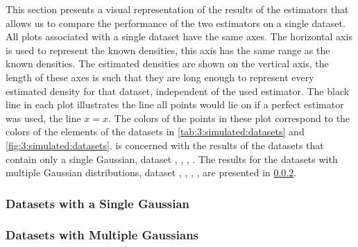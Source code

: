 This section presents a visual representation of the results of the estimators that allows us to compare the performance of the two estimators on a single dataset. All plots associated with a single dataset have the same axes. The horizontal axis is used to represent the known densities, this axis has the same range as the known densities. The estimated densities are shown on the vertical axis, the length of these axes is such that they are long enough to represent every estimated density for that dataset, independent of the used estimator. The black line in each plot illustrates the line all points would lie on if a perfect estimator was used, \ie the line $x = x$. The colors of the points in these plot correspond to the colors of the elements of the datasets in \cref{tab:3:simulated:datasets} and \cref{fig:3:simulated:datasets}.  is concerned with the results of the datasets that contain only a single Gaussian, \ie dataset \ferdosiOne, \baakmanOne, \baakmanFour, \baakmanFive. The results for the datasets with multiple Gaussian distributions, \ie dataset \ferdosiTwo, \baakmanTwo, \ferdosiThree, \baakmanThree, are presented in \cref{s:results:plots:multipleGaussians}.

\subsubsection{Datasets with a Single Gaussian}
	\label{s:results:plots:singleGaussian}
	


\subsubsection{Datasets with Multiple Gaussians}
	\label{s:results:plots:multipleGaussians}
	


